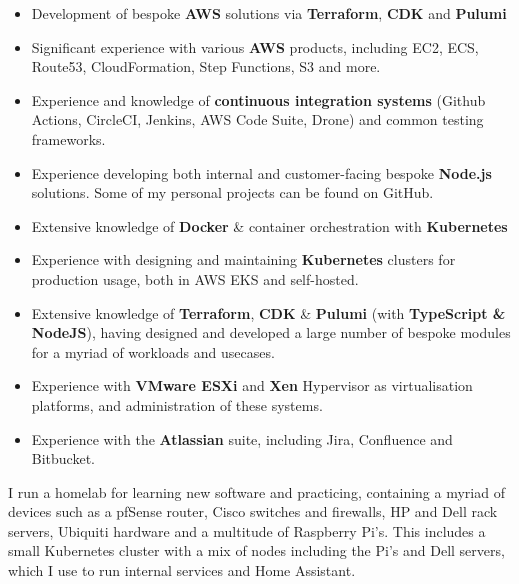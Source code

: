 \documentclass[10pt,a4paper,ragged2e]{altacv}
\begin{document}
\begin{itemize}
  \item Development of bespoke {\bf AWS} solutions via {\bf Terraform}, {\bf CDK} and {\bf Pulumi}
  \item Significant experience with various {\bf AWS} products, including EC2, ECS, Route53, CloudFormation, Step Functions, S3 and more.
  \item Experience and knowledge of {\bf continuous integration systems} (Github Actions, CircleCI, Jenkins, AWS Code Suite, Drone) and common testing frameworks.
  \item Experience developing both internal and customer-facing bespoke {\bf Node.js} solutions. Some of my personal projects can be found on GitHub.
  \item Extensive knowledge of {\bf Docker} \& container orchestration with {\bf Kubernetes}
  \item Experience with designing and maintaining {\bf Kubernetes} clusters for production usage, both in AWS EKS and self-hosted.
  \item Extensive knowledge of {\bf Terraform}, {\bf CDK} \& {\bf Pulumi} (with {\bf TypeScript \& NodeJS}), having designed and developed a large number of bespoke modules for a myriad of workloads and usecases.
  \item Experience with {\bf VMware ESXi} and {\bf Xen} Hypervisor as virtualisation platforms, and administration of these systems.
  \item Experience with the {\bf Atlassian} suite, including Jira, Confluence and Bitbucket.
\end{itemize}
\clearpage

I run a homelab for learning new software and practicing, containing a myriad of devices such as a pfSense router, Cisco switches and firewalls, HP and Dell rack servers, Ubiquiti hardware and a multitude of Raspberry Pi's. This includes a small Kubernetes cluster with a mix of nodes including the Pi's and Dell servers, which I use to run internal services and Home Assistant.

\smallskip

\end{document}
